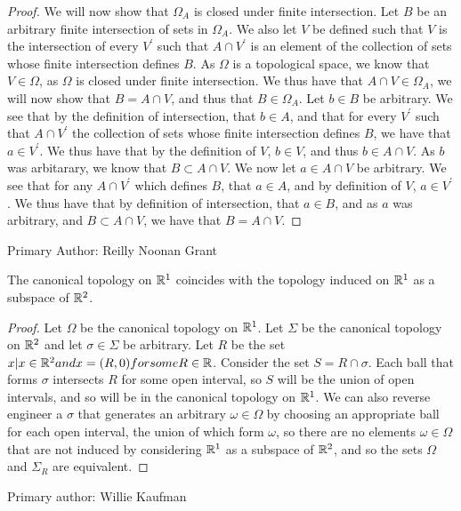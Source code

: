 \begin{proof}
  We will now show that $\Omega_A$ is closed under finite
  intersection. Let $B$ be an arbitrary finite intersection of sets in
  $\Omega_A$. We also let $V$ be defined such that $V$ is the
  intersection of every $V^\prime$ such that $A\cap V^\prime$ is an
  element of the collection of sets whose finite intersection defines
  $B$. As $\Omega$ is a topological space, we know that $V\in \Omega$,
  as $\Omega$ is closed under finite intersection. We thus have that
  $A\cap V \in \Omega_A$, we will now show that $B =A\cap V$, and thus
  that $B\in \Omega_A$. Let $b \in B$ be arbitrary. We see that by the
  definition of intersection, that $b \in A$, and that for every
  $V^\prime$ such that $A\cap V^\prime$ the collection of sets whose
  finite intersection defines $B$, we have that $a \in V^\prime$. We
  thus have that by the definition of $V$, $b\in V$, and thus $b \in A
  \cap V$. As $b$ was arbitarary, we know that $B \subset A \cap
  V$. We now let $a \in A \cap V$ be arbitrary. We see that for any $A
  \cap V^\prime$ which defines $B$, that $a \in A$, and by definition
  of $V$, $a \in V^\prime$. We thus have that by definition of
  intersection, that $a \in B$, and as $a$ was arbitrary, and 
  $B \subset A \cap V$, we have that $B = A \cap V$.
\end{proof}

Primary Author: Reilly Noonan Grant

\begin{majorEx}%
The canonical topology on $\mathbb{R}^1$ coincides with the topology induced on $\mathbb{R}^1$ as a subspace of $\mathbb{R}^2$.
\end{majorEx}
\begin{proof}
Let $\Omega$ be the canonical topology on $\mathbb{R}^1$. Let $\Sigma$ be the canonical topology on $\mathbb{R}^2$
and let $\sigma \in \Sigma$ be arbitrary. Let $R$ be the set ${x | x \in \mathbb{R}^2 and x = (R, 0) for some R \in \mathbb{R}}$. Consider the set $S = {R \cap \sigma}$. Each ball that forms $\sigma$ intersects $R$ for some open interval, so $S$ will be the union of open intervals, and so will be in the canonical topology on $\mathbb{R}^1$. We can also reverse engineer a $\sigma$ that generates an arbitrary $\omega \in \Omega$ by choosing an appropriate ball for each open interval, the union of which form $\omega$, so there are no elements $\omega \in \Omega$ that are not induced by considering $\mathbb{R}^1$ as a subspace of $\mathbb{R}^2$, and so the sets $\Omega$ and $\Sigma_R$ are equivalent.
\end{proof}

Primary author: Willie Kaufman


